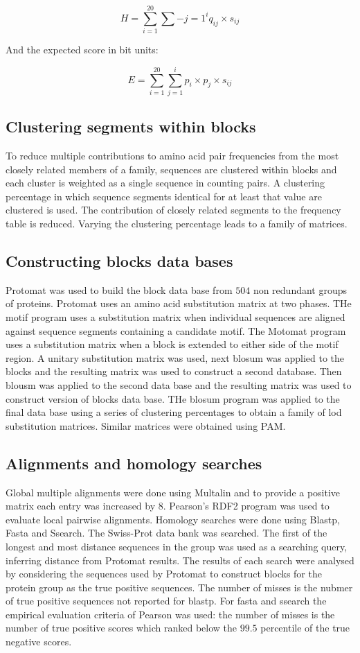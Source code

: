 	$$ H = \sum\limits_{i=1}^{20}\sum\limits-{j=1}^i q_{ij}\times s_{ij}$$

	And the expected score in bit units:

	$$E = \sum\limits_{i=1}^{20}\sum\limits_{j=1}^i p_i\times p_j\times s_{ij}$$

	\subsection{Clustering segments within blocks}
	To reduce multiple contributions to amino acid pair frequencies from the most closely related members of a family, sequences are clustered within blocks and each cluster is weighted as a single sequence in counting pairs.
	A clustering percentage in which sequence segments identical for at least that value are clustered is used.
	The contribution of closely related segments to the frequency table is reduced.
	Varying the clustering percentage leads to a family of matrices.

	\subsection{Constructing blocks data bases}
	Protomat was used to build the block data base from $504$ non redundant groups of proteins.
	Protomat uses an amino acid substitution matrix at two phases.
	THe motif program uses a substitution matrix when individual sequences are aligned against sequence segments containing a candidate motif.
	The Motomat program uses a substitution matrix when a block is extended to either side of the motif region.
	A unitary substitution matrix was used, next blosum was applied to the blocks and the resulting matrix was used to construct a second database.
	Then blousm was applied to the second data base and the resulting matrix was used to construct version of blocks data base.
	THe blosum program was applied to the final data base using a series of clustering percentages to obtain a family of lod substitution matrices.
	Similar matrices were obtained using PAM.

	\subsection{Alignments and homology searches}
	Global multiple alignments were done using Multalin and to provide a positive matrix each entry was increased by $8$.
	Pearson's RDF2 program was used to evaluate local pairwise alignments.
	Homology searches were done using Blastp, Fasta and Ssearch.
	The Swiss-Prot data bank was searched.
	The first of the longest and most distance sequences in the group was used as a searching query, inferring distance from Protomat results.
	The results of each search were analysed by considering the sequences used by Protomat to construct blocks for the protein group as the true positive sequences.
	The number of misses is the nubmer of true positive sequences not reported for blastp.
	For fasta and ssearch the empirical evaluation criteria of Pearson was used: the number of misses is the number of true positive scores which ranked below the $99.5$ percentile of the true negative scores.

